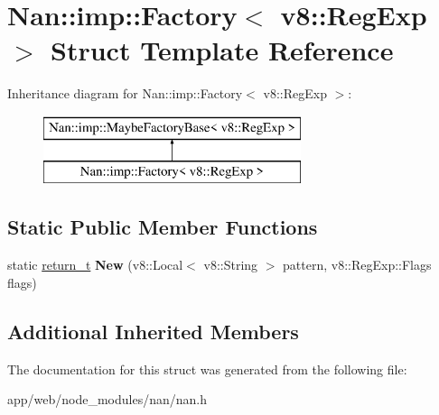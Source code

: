 \hypertarget{struct_nan_1_1imp_1_1_factory_3_01v8_1_1_reg_exp_01_4}{}\section{Nan\+:\+:imp\+:\+:Factory$<$ v8\+:\+:Reg\+Exp $>$ Struct Template Reference}
\label{struct_nan_1_1imp_1_1_factory_3_01v8_1_1_reg_exp_01_4}
Inheritance diagram for Nan\+:\+:imp\+:\+:Factory$<$ v8\+:\+:Reg\+Exp $>$\+:\begin{figure}[H]
\begin{center}
\leavevmode
\includegraphics[height=2.000000cm]{struct_nan_1_1imp_1_1_factory_3_01v8_1_1_reg_exp_01_4}
\end{center}
\end{figure}
\subsection*{Static Public Member Functions}
\begin{DoxyCompactItemize}
\item 
\mbox{\label{struct_nan_1_1imp_1_1_factory_3_01v8_1_1_reg_exp_01_4_a8c93f216da56caeacf33489ae96f749a}} 
static \hyperlink{class_maybe_local}{return\+\_\+t} {\bfseries New} (v8\+::\+Local$<$ v8\+::\+String $>$ pattern, v8\+::\+Reg\+Exp\+::\+Flags flags)
\end{DoxyCompactItemize}
\subsection*{Additional Inherited Members}


The documentation for this struct was generated from the following file\+:\begin{DoxyCompactItemize}
\item 
app/web/node\+\_\+modules/nan/nan.\+h\end{DoxyCompactItemize}
